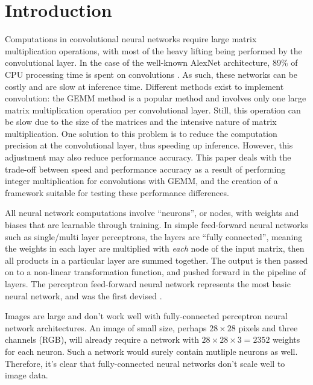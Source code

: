 \chapter{Introduction}

Computations in convolutional neural networks require large matrix multiplication operations, with most of the heavy lifting being performed by the convolutional layer. In the case of the well-known AlexNet architecture, 89\% of CPU processing time is spent on convolutions \cite{warden_gemm}. As such, these networks can be costly and are slow at inference time. Different methods exist to implement convolution: the GEMM method is a popular method and involves only one large matrix multiplication operation per convolutional layer. Still, this operation can be slow due to the size of the matrices and the intensive nature of matrix multiplication. One solution to this problem is to reduce the computation precision at the convolutional layer, thus speeding up inference. However, this adjustment may also reduce performance accuracy. This paper deals with the trade-off between speed and performance accuracy as a result of performing integer multiplication for convolutions with GEMM, and the creation of a framework suitable for testing these performance differences.

All neural network computations involve ``neurons'', or nodes, with weights and biases that are learnable through training. In simple feed-forward neural networks such as single/multi layer perceptrons, the layers are ``fully connected'', meaning the weights in each layer are multiplied with \textit{each} node of the input matrix, then all products in a particular layer are summed together. The output is then passed on to a non-linear transformation function, and pushed forward in the pipeline of layers. The perceptron feed-forward neural network represents the most basic neural network, and was the first devised \cite{perceptron}.

Images are large and don't work well with fully-connected perceptron neural network architectures. An image of small size, perhaps $28\times28$ pixels and three channels (RGB), will already require a network with $28\times28\times3 = 2352$ weights for each neuron. Such a network would surely contain mutliple neurons as well. Therefore, it's clear that fully-connected neural networks don't scale well to image data. 

